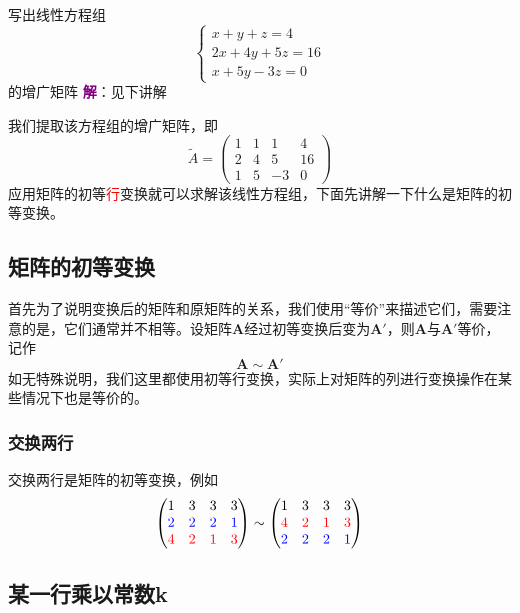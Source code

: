 \begin{example}
	写出线性方程组$$\left\{\begin{matrix} 
		x+y+z=4 \\  
		2x+4y+5z=16 \\
		x+5y-3z=0
	\end{matrix}\right. $$的增广矩阵
	\tcblower
	\textcolor{purple}{\textbf{解}}：见下讲解
\end{example}

我们提取该方程组的增广矩阵，即$$\tilde{A}=\begin{pmatrix}
	1 & 1 & 1 & 4\\
	2 & 4 & 5 & 16\\
	1 & 5 & -3 & 0
\end{pmatrix}$$应用矩阵的初等\textcolor{red}{行}变换就可以求解该线性方程组，下面先讲解一下什么是矩阵的初等变换。

\subsection{矩阵的初等变换}

首先为了说明变换后的矩阵和原矩阵的关系，我们使用``等价''来描述它们，需要注意的是，它们通常并不相等。设矩阵$\mathbf{A}$经过初等变换后变为$\mathbf{A}'$，则$\mathbf{A}$与$\mathbf{A}'$等价，记作$$\mathbf{A}\sim \mathbf{A}'$$如无特殊说明，我们这里都使用初等行变换，实际上对矩阵的列进行变换操作在某些情况下也是等价的。

\subsubsection{交换两行}

交换两行是矩阵的初等变换，例如$$\begin{pmatrix}
	1 & 3 & 3 & 3\\
\textcolor{blue}{2} & \textcolor{blue}{2} & \textcolor{blue}{2} & \textcolor{blue}{1}\\
	\textcolor{red}{4} & \textcolor{red}{2} & \textcolor{red}{1} & \textcolor{red}{3}
\end{pmatrix}\sim\begin{pmatrix}
	1 & 3 & 3 & 3\\
	\textcolor{red}{4} & \textcolor{red}{2} & \textcolor{red}{1} & \textcolor{red}{3}\\
	\textcolor{blue}{2} & \textcolor{blue}{2} & \textcolor{blue}{2} & \textcolor{blue}{1}
\end{pmatrix}$$

\subsection{某一行乘以常数k}

